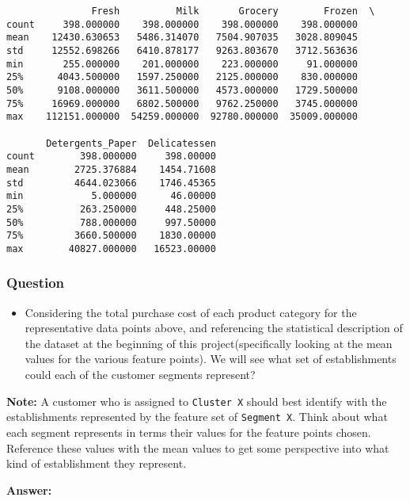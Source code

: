 \documentclass[11pt]{article}
\providecommand{\tightlist}{%
      \setlength{\itemsep}{0pt}\setlength{\parskip}{0pt}}
\begin{document}
    
    \begin{verbatim}
               Fresh          Milk       Grocery        Frozen  \
count     398.000000    398.000000    398.000000    398.000000   
mean    12430.630653   5486.314070   7504.907035   3028.809045   
std     12552.698266   6410.878177   9263.803670   3712.563636   
min       255.000000    201.000000    223.000000     91.000000   
25%      4043.500000   1597.250000   2125.000000    830.000000   
50%      9108.000000   3611.500000   4573.000000   1729.500000   
75%     16969.000000   6802.500000   9762.250000   3745.000000   
max    112151.000000  54259.000000  92780.000000  35009.000000   

       Detergents_Paper  Delicatessen  
count        398.000000     398.00000  
mean        2725.376884    1454.71608  
std         4644.023066    1746.45365  
min            5.000000      46.00000  
25%          263.250000     448.25000  
50%          788.000000     997.50000  
75%         3660.500000    1830.00000  
max        40827.000000   16523.00000  
    \end{verbatim}

    
    \subsubsection{Question}\label{question}

\begin{itemize}
\tightlist
\item
  Considering the total purchase cost of each product category for the
  representative data points above, and referencing the statistical
  description of the dataset at the beginning of this
  project(specifically looking at the mean values for the various
  feature points). We will see what set of establishments could each of
  the customer segments represent?
\end{itemize}

\textbf{Note:} A customer who is assigned to
\texttt{\textquotesingle{}Cluster\ X\textquotesingle{}} should best
identify with the establishments represented by the feature set of
\texttt{\textquotesingle{}Segment\ X\textquotesingle{}}. Think about
what each segment represents in terms their values for the feature
points chosen. Reference these values with the mean values to get some
perspective into what kind of establishment they represent.

    \textbf{Answer:}
\end{document}
